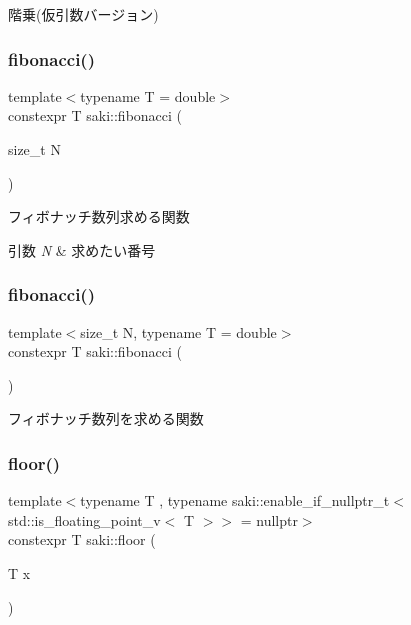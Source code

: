 階乗(仮引数バージョン) 

\mbox{\label{namespacesaki_a93bb6ae29766c4204c1cf8dc5bab007c}} 
\subsubsection{\texorpdfstring{fibonacci()}{fibonacci()}\hspace{0.1cm}{\footnotesize\ttfamily [1/2]}}
{\footnotesize\ttfamily template$<$typename T  = double$>$ \\
constexpr T saki\+::fibonacci (\begin{DoxyParamCaption}\item[{size\+\_\+t}]{N }\end{DoxyParamCaption})}



フィボナッチ数列求める関数 


\begin{DoxyParams}{引数}
{\em N} & 求めたい番号 \\
\hline
\end{DoxyParams}
\mbox{\label{namespacesaki_a7bbb434ee3c6d77eeb32b85bb9e316f0}} 
\subsubsection{\texorpdfstring{fibonacci()}{fibonacci()}\hspace{0.1cm}{\footnotesize\ttfamily [2/2]}}
{\footnotesize\ttfamily template$<$size\+\_\+t N, typename T  = double$>$ \\
constexpr T saki\+::fibonacci (\begin{DoxyParamCaption}{ }\end{DoxyParamCaption})}



フィボナッチ数列を求める関数 

\mbox{\label{namespacesaki_a0718c031975604811084b62bbba93f7f}} 
\subsubsection{\texorpdfstring{floor()}{floor()}\hspace{0.1cm}{\footnotesize\ttfamily [1/2]}}
{\footnotesize\ttfamily template$<$typename T , typename saki\+::enable\+\_\+if\+\_\+nullptr\+\_\+t$<$ std\+::is\+\_\+floating\+\_\+point\+\_\+v$<$ T $>$$>$  = nullptr$>$ \\
constexpr T saki\+::floor (\begin{DoxyParamCaption}\item[{T}]{x }\end{DoxyParamCaption})}



